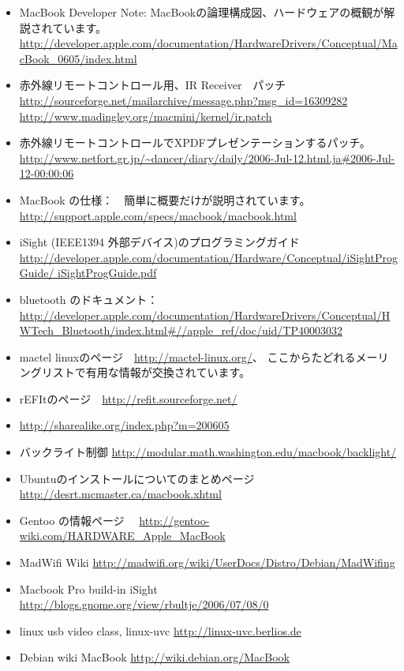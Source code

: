 \documentclass[mingoth,a4paper]{jsarticle}
\begin{document}
\begin{itemize}
 \item MacBook Developer Note: MacBookの論理構成図、ハードウェアの概観が解説されています。　
       \url{http://developer.apple.com/documentation/HardwareDrivers/Conceptual/MacBook_0605/index.html}
 \item 赤外線リモートコントロール用、IR Receiver　パッチ
       \url{http://sourceforge.net/mailarchive/message.php?msg_id=16309282}
       \url{http://www.madingley.org/macmini/kernel/ir.patch}
 \item 赤外線リモートコントロールでXPDFプレゼンテーションするパッチ。
       \url{http://www.netfort.gr.jp/~dancer/diary/daily/2006-Jul-12.html.ja#2006-Jul-12-00:00:06}
 \item MacBook の仕様：　簡単に概要だけが説明されています。
       \url{http://support.apple.com/specs/macbook/macbook.html}
 \item iSight (IEEE1394 外部デバイス)のプログラミングガイド　
       \url{http://developer.apple.com/documentation/Hardware/Conceptual/iSightProgGuide/
iSightProgGuide.pdf}
 \item bluetooth のドキュメント：　\url{http://developer.apple.com/documentation/HardwareDrivers/Conceptual/HWTech_Bluetooth/index.html#//apple_ref/doc/uid/TP40003032}
 \item mactel linuxのページ　\url{http://mactel-linux.org/}、
       ここからたどれるメーリングリストで有用な情報が交換されています。
 \item rEFItのページ　\url{http://refit.sourceforge.net/}
 \item \url{http://sharealike.org/index.php?m=200605}
 \item バックライト制御
       \url{http://modular.math.washington.edu/macbook/backlight/}
 \item Ubuntuのインストールについてのまとめページ
       \url{http://desrt.mcmaster.ca/macbook.xhtml}
 \item Gentoo の情報ページ　
       \url{http://gentoo-wiki.com/HARDWARE_Apple_MacBook}
 \item MadWifi Wiki
       \url{http://madwifi.org/wiki/UserDocs/Distro/Debian/MadWifing}
 \item Macbook Pro build-in iSight
       \url{http://blogs.gnome.org/view/rbultje/2006/07/08/0}
 \item linux usb video class, linux-uvc
       \url{http://linux-uvc.berlios.de}
 \item Debian wiki MacBook \url{http://wiki.debian.org/MacBook}
\end{itemize}
\end{document}
